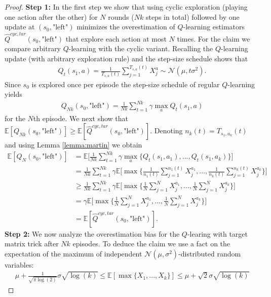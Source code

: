 \documentclass{article}
\newcommand{\E}{\mathbb{E}}
\theoremstyle{plain}
\theoremstyle{definition}
\theoremstyle{remark}
\begin{document}
\begin{proof}
    \textbf{Step 1:} In the first step we show that using cyclic exploration (playing one action after the other) for $N$ rounds ($Nk$ steps in total) followed by one update at $(s_0,\text{"left"})$ minimizes the overestimation of $Q$-learning estimators $\hat Q^{cyc,tar}(s_0,\text{"left"})$ that explore each action at most $N$ times.   
    For the claim we compare arbitrary $Q$-learning with the cyclic variant.    
    Recalling the $Q$-learning update (with arbitrary exploration rule) and the step-size schedule shows that 
    \begin{align*}
        Q_{t}(s_1,a)=\frac{1}{T_{s,a}(t)}\sum_{j=1}^{T_{s,a}(t)} X^a_j\sim \mathcal N(\mu,t\sigma^2).
    \end{align*}
    Since $s_0$ is explored once per episode the step-size schedule of regular $Q$-learning yields
    \begin{align*}
        Q_{Nk}(s_0,\text{"left"})= \frac{1}{Nk}\sum_{t=1}^{Nk} \gamma\max_a Q_t(s_1,a)
    \end{align*}
    for the $N$th episode. We next show that $\E[Q_{Nk}(s_0,\text{"left"})]\geq \E[\hat Q^{cyc,tar}(s_0,\text{"left"})]$. Denoting $n_k(t)=T_{s_1,a_k}(t)$ and using Lemma \ref{lemma:martin} we obtain
    \begin{align*}
        \E[Q_N(s_0,\text{"left"})]
         &=\E\Big[\frac{1}{Nk}\sum_{t=1}^{Nk} \gamma\max_a\big\{ Q_t(s_1,a_1),...,Q_t(s_1,a_k)\big\}\Big]\\
        &=\frac{1}{Nk}\sum_{t=1}^{Nk}\gamma \E\Big[\max \Big\{\frac{1}{n_1(t)}\sum_{j=1}^{n_1(t)}X^{a_1}_j,...,\frac{1}{n_k(t)}\sum_{j=1}^{n_k(t)}X^{a_k}_j\Big\}\Big]\\
        &\geq\frac{1}{Nk}\sum_{t=1}^{Nk}\gamma \E\Big[\max \Big\{\frac{1}{N}\sum_{j=1}^{N}X^{a_1}_j,...,\frac{1}{N}\sum_{j=1}^{N}X^{a_k}_j\Big\}\Big]\\
        &=\gamma \E\Big[\max \Big\{\frac{1}{N}\sum_{j=1}^{N}X^{a_1}_j,...,\frac{1}{N}\sum_{j=1}^{N}X^{a_k}_j\Big\}\Big]\\
        &=\E[\hat Q^{cyc,tar}(s_0,\text{"left"})].
    \end{align*}
\textbf{Step 2:} We now analyze the overestimation bias for the $Q$-learing with target matrix trick after $Nk$ episodes. To deduce the claim we use a fact on the expectation of the maximum of independent $\mathcal N(\mu,\sigma^2)$-distributed random variables:
\begin{align*}
    \mu+\frac{1}{\sqrt{\pi\log(2) }}\sigma\sqrt{\log(k)}\leq \E[\max\{X_1,...,X_k\}]\leq \mu+\sqrt{2}\sigma\sqrt{\log(k)}

\end{align*}
\end{proof}
\end{document}
